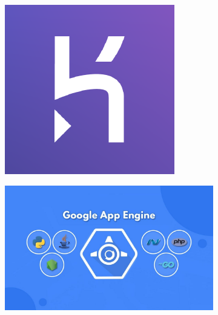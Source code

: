 \begin{figure}[h!]
  \centering
  \begin{subfigure}[b]{0.1\textwidth}
    \includegraphics[width=\textwidth]{Images/heroku.png}
    \label{fig:heroku}
  \end{subfigure}
  \hfill
  \begin{subfigure}[b]{0.2\textwidth}
    \includegraphics[width=\textwidth]{Images/google-app-engine.jpg}
    \label{fig:gae}
  \end{subfigure}
  \hfill
  \begin{subfigure}[b]{0.3\textwidth}

\end{subfigure}
\end{figure}
